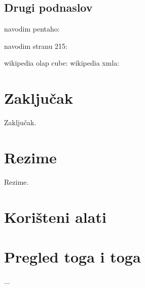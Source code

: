 \documentclass[times, utf8, seminar]{fit}
\begin{document}
\section{Drugi podnaslov}

navodim pentaho: \cite{pentaho32}

navodim stranu 215: \cite[str.~215]{pentaho32}

wikipedia olap cube: \cite{web:wikipedia:olap_cube}
wikipedia xmla: \cite{web:wikipedia:xmla}




\chapter{Zaključak}
Zaključak.




\chapter{Rezime}
Rezime.

\appendix

\chapter{Korišteni alati}

\chapter{Pregled toga i toga}

...
\end{document}
